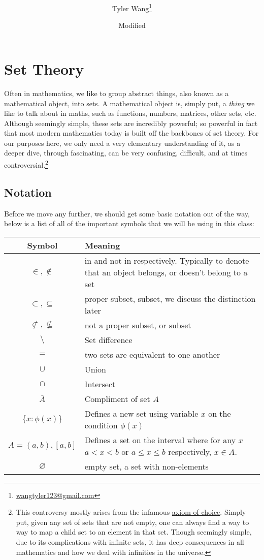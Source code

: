 \documentclass[11pt]{article}
\title{\mytitle \\ [2ex] \Large \mysubtitle}
\date{\small Modified \mydate}
\author {Tyler Wang\thanks{
\href{mailto:wangtyler123@gmail.com}{wangtyler123@gmail.com}}}
\numberwithin{lemma}{section}
\numberwithin{equation}{section}
\numberwithin{define}{section}
\numberwithin{prop}{section}
\numberwithin{figure}{section}
\numberwithin{theorem}{section}
\newcounter{ex}[section]
\numberwithin{ex}{section}
\begin{document}
\maketitle
\section{Set Theory}
Often in mathematics, we like to group abstract things, also known as a mathematical object, into sets. A mathematical object is, simply put, a \textit{thing} we like to talk about in maths, such as functions, numbers, matrices, other sets, etc.
Although seemingly simple, these sets are incredibly powerful; so powerful in fact that most modern mathematics today is built off the backbones of set theory. 
For our purposes here, we only need a very elementary understanding of it, as a deeper dive, through fascinating, can be very confusing, difficult, and at times controversial.\footnote{This controversy mostly arises from the infamous \href{https://en.wikipedia.org/wiki/Axiom_of_choice}{axiom of choice}. 
Simply put, given any set of sets that are not empty, one can always find a way to way to map a child set to an element in that set. Though seemingly simple, due to its complications with infinite sets, it has deep consequences in all mathematics and how we deal with infinities in the universe.}
\subsection{Notation}
Before we move any further, we should get some basic notation out of the way, below is a list of all of the important symbols that we will be using in this class:
\begin{center}
	\begin{longtable}{| c | m{8cm} |}
		\hline 
		Symbol & Meaning \\
		\hline 
		$\in,\notin$   & in and not in respectively. Typically to denote that an object belongs, or doesn't belong to a set \\
		\hline 
		$\subset, \subseteq$ & proper subset, subset, we discuss the distinction later \\
		\hline
		$\not\subset, \not\subseteq$ & not a proper subset, or subset \\
		\hline
		$\setminus$ & Set difference \\
		\hline
		$=$ & two sets are equivalent to one another \\
		\hline 
		$\cup$ & Union \\
		\hline
		$\cap$ & Intersect \\
		\hline

		$\overline{A}$ & Compliment of set $A$ \\
		\hline
		$\{x : \phi(x)\}$ & Defines a new set using variable $x$ on the condition $\phi(x)$\\
		\hline
		$A=(a,b),[a,b]$ & Defines a set on the interval where for any $x$ $a < x < b$ or $a\le x \le b$ respectively, $x\in A$. \\
		\hline
		$\varnothing$ & empty set, a set with non-elements \\
		\hline
	\end{longtable}
\end{center}
\end{document}
